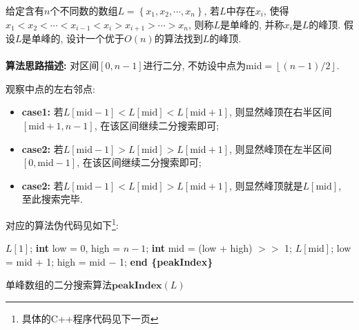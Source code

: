 \documentclass{article}
\begin{document}
\pagebreak


\begin{homeworkProblem}

	给定含有$n$个不同数的数组$L=\left\{ x_1,x_2,\cdots, x_n \right\}$, 若$L$中存在$x_i$, 使得$x_1<x_2<\cdots<x_{i-1}<x_i>x_{i+1}>\cdots >x_n$, 则称$L$是单峰的, 并称$x_i$是$L$的峰顶. 假设$L$是单峰的, 设计一个优于$O(n)$的算法找到$L$的峰顶.
	\\

	\solution
	\\

	\textbf{算法思路描述:} 对区间$[0,n-1]$进行二分, 不妨设中点为mid$=\left\lfloor (n-1)/2\right\rfloor $. 
	
	观察中点的左右邻点: 
	\begin{itemize}
		\item \textbf{case1:} 若$L\left[ \mathrm{mid}-1 \right] <L\left[ \mathrm{mid} \right] <L\left[ \mathrm{mid}+1 \right]$, 则显然峰顶在右半区间$[\text{mid} +  1, n - 1]$, 在该区间继续二分搜索即可;
		\item \textbf{case2:} 若$L\left[ \mathrm{mid}-1 \right] >L\left[ \mathrm{mid} \right] >L\left[ \mathrm{mid}+1 \right]$, 则显然峰顶在左半区间$[0, \text{mid} -  1]$, 在该区间继续二分搜索即可;
		\item \textbf{case2:} 若$L\left[ \mathrm{mid}-1 \right] <L\left[ \mathrm{mid} \right] >L\left[ \mathrm{mid}+1 \right]$, 则显然峰顶就是$L\left[ \mathrm{mid} \right]$, 至此搜索完毕.
	\end{itemize}
	对应的算法伪代码见如下\footnote{具体的C++程序代码见下一页}:
	\begin{algorithm}[H]
		\begin{algorithmic}[1]
		 
			\State \Return $L[1]$; 
		\Else
			\State \textbf{int} low = 0, high = $n-1$;
				\State \textbf{int} mid = (low + high) $>>$ 1;
					\State \Return $L\left[ \mathrm{mid} \right]$;
					\State low = mid $+$ 1;
				\Else
					\State high = mid $-$ 1;
				\EndIf
			\EndWhile
		\EndIf
		\State \textbf{end \{peakIndex\}}
		\end{algorithmic}
		\caption{单峰数组的二分搜索算法$\textbf{peakIndex}(L)$}
		\label{alg:单峰数组的二分搜索算法}

\end{algorithm}
\end{homeworkProblem}
\end{document}
